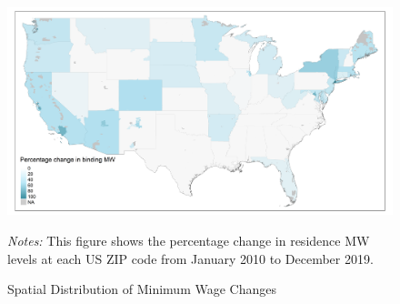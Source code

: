 \begin{figure}[h!]
	\centering
	\caption{Spatial Distribution of Minimum Wage Changes}
	\label{fig:mw_perc_changes_long_run}
	\includegraphics[width = \textwidth]
	    {../../analysis/maps_mw_long_run/output/USchange_perc_actual_mw.png}
	\begin{minipage}{.95\textwidth} \footnotesize
		\vspace{3mm}
		\textit{Notes:} This figure shows the percentage change in residence MW levels
		at each US ZIP code from January 2010 to December 2019.
	\end{minipage}
\end{figure}
